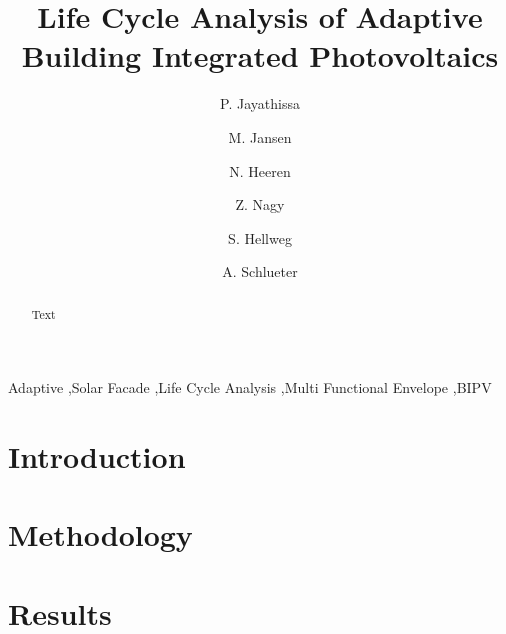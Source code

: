 \documentclass[preprint,12pt]{elsarticle} %
\begin{document}
\begin{frontmatter}

\title{Life Cycle Analysis of Adaptive Building Integrated Photovoltaics} 


\author[ita]{P. Jayathissa }

\author[ita]{M. Jansen}

\author[baug]{N. Heeren}

\author[ita]{Z. Nagy}

\author[baug]{S. Hellweg}


\author[ita]{A. Schlueter  }



\address[ita]{Architecture and Building Systems, Institute of Technology in Architecture, Department of Architecture,\\ ETH Zurich, Switzerland} 
\address[baug]{Ecological System Design, Institute of Environmental Engineering,\\ ETH Zurich, Switzerland}

\begin{abstract}
Text 
\end{abstract}

\begin{keyword}
Adaptive \sep Solar Facade \sep Life Cycle Analysis \sep Multi Functional Envelope \sep BIPV
\end{keyword}

\end{frontmatter}

\section{Introduction}
\label{ch:introduction}


\section{Methodology}
\label{ch:method}


\section{Results}
\label{ch:results}


\end{document}
